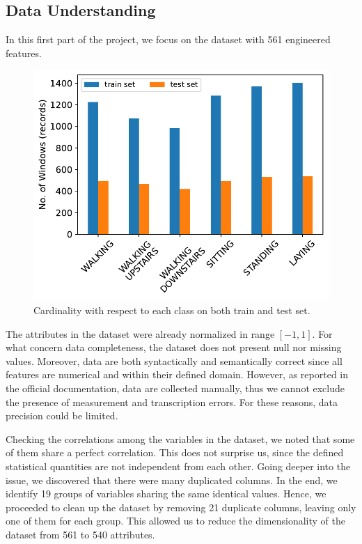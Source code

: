 \documentclass[10pt, a4paper, twocolumn]{article}
\begin{document}
\subsection{Data Understanding}\label{subsec:data_understanding}

In this first part of the project, we focus on the dataset with 561 engineered features. 

\begin{figure}
    \centering
    \includegraphics[width=0.7\linewidth]{immagini simone/cardinality_datasets.pdf}
    \caption{Cardinality with respect to each class on both train and test set.}
    \label{fig:cardinality}
\end{figure}

The attributes in the dataset were already normalized in range $[-1,1]$. For what concern data completeness, the dataset does not present null nor missing values. Moreover, data are both syntactically and semantically correct since all features are numerical and within their defined domain. However, as reported in the official documentation, data are collected manually, thus we cannot exclude the presence of measurement and transcription errors. For these reasons, data precision could be limited. 

Checking the correlations among the variables in the dataset, we noted that some of them share a perfect correlation. This does not surprise us, since the defined statistical quantities are not independent from each other. Going deeper into the issue, we discovered that there were many duplicated columns. In the end, we identify 19 groups of variables sharing the same identical values. Hence, we proceeded to clean up the dataset by removing 21 duplicate columns, leaving only one of them for each group. This allowed us to reduce the dimensionality of the dataset from 561 to 540 attributes.
\end{document}
